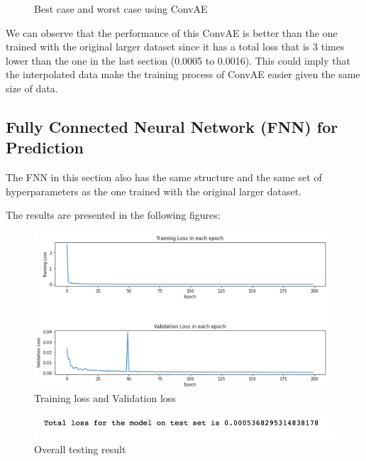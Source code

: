 \begin{figure}[H]
\caption{Best case and worst case using ConvAE}
\label{fig:figures}
\end{figure}

We can observe that the performance of this ConvAE is better than the one trained with the original larger dataset since it has a total loss that is 3 times lower than the one in the last section (0.0005 to 0.0016). This could imply that the interpolated data make the training process of ConvAE easier given the same size of data. 


\subsection{Fully Connected Neural Network (FNN) for Prediction}

The FNN in this section also has the same structure and the same set of hyperparameters as the one trained with the original larger dataset.

The results are presented in the following figures:

\begin{figure}[H]
    \caption{Training loss and Validation loss}
    \includegraphics[scale=0.6]{Report LaTeX/figures/mantle_convection_images/larger_dataset_interpolated/FNN_trainingData.png}
\end{figure}

\begin{figure}[H]
    \caption{Overall testing result}
    \includegraphics[scale=0.8]{Report LaTeX/figures/mantle_convection_images/larger_dataset_interpolated/FNN_OverallTesting.png}
\end{figure}

